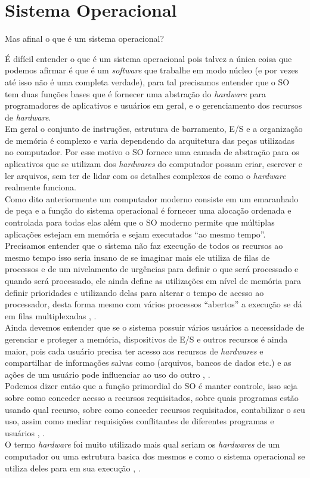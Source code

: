 \chapter[Sistema Operacional]{Sistema Operacional}

Mas afinal o que é um sistema operacional?

É difícil entender o que é um sistema operacional pois talvez a única coisa que podemos afirmar é que é um \emph{software} que trabalhe em modo núcleo (e por vezes até isso não é uma completa verdade), para tal precisamos entender que o SO tem duas funções bases que é fornecer uma abstração do \emph{hardware} para programadores de aplicativos e usuários em geral, e o gerenciamento dos recursos de \emph{hardware}.\\
 Em geral o conjunto de instruções, estrutura de barramento, E/S e a organização de memória é complexo e varia dependendo da arquitetura das peças utilizadas no computador. Por esse motivo o SO fornece uma camada de abstração para os aplicativos que se utilizam dos \emph{hardwares} do computador possam criar, escrever e ler arquivos, sem ter de lidar com os detalhes complexos de como o \emph{hardware} realmente funciona.\\
Como dito anteriormente um computador moderno consiste em um emaranhado de peça e a função do sistema operacional é fornecer uma alocação ordenada e controlada para todas elas além que o SO moderno permite que múltiplas aplicações estejam em memória e sejam executados “ao mesmo tempo”. \\
Precisamos entender que o sistema não faz  execução de todos os recursos ao mesmo tempo isso seria insano de se imaginar mais ele utiliza de filas de processos e de um nivelamento de urgências para definir o que será processado e quando será processado, ele ainda define as utilizações em nível de memória para definir prioridades e utilizando delas para alterar o tempo  de acesso ao processador, desta forma mesmo com vários processos “abertos” a execução se dá em filas multiplexadas \cite{Tanenbaum2016}, \cite{Comer2012}.\\
Ainda devemos entender que se o sistema possuir vários usuários a necessidade de gerenciar e proteger a memória, dispositivos de E/S e outros recursos é ainda maior, pois cada usuário precisa ter acesso aos recursos de \emph{hardwares} e compartilhar de informações salvas como (arquivos, bancos de dados etc.) e as ações de um usuário pode influenciar ao uso do outro \cite{Tanenbaum2016}, \cite{Comer2012}.\\
Podemos dizer então que a função primordial do SO é manter controle, isso seja sobre como conceder acesso a recursos requisitados, sobre quais programas estão usando qual recurso, sobre como conceder recursos requisitados, contabilizar o seu uso, assim como mediar requisições conflitantes de diferentes programas e usuários \cite{Tanenbaum2016}, \cite{Comer2012}.\\
O termo \emph{hardware} foi muito utilizado mais qual seriam os \emph{hardwares} de um computador ou uma estrutura basica dos mesmos e como o sistema operacional se utiliza deles para em sua execução \cite{Tanenbaum2016}, \cite{Comer2012}.

